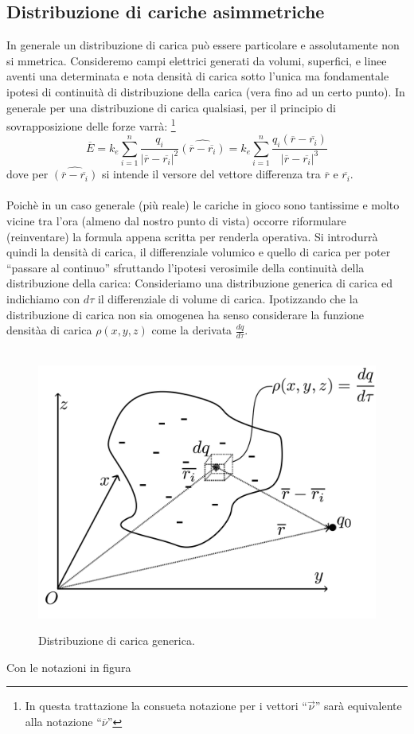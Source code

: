 \documentclass[11pt]{article}
\begin{document}
\subsection{Distribuzione di cariche asimmetriche}
In generale un distribuzione di carica può essere particolare e assolutamente non si mmetrica. Consideremo campi elettrici generati da volumi, superfici, e linee aventi una determinata e nota densità di carica sotto l'unica ma fondamentale ipotesi di continuità di distribuzione della carica (vera fino ad un certo punto).
In generale per una distribuzione di carica qualsiasi, per il principio di sovrapposizione delle forze varrà:
\footnote{In questa trattazione la consueta notazione per i vettori ``$\overrightarrow{\nu}$'' sarà equivalente alla notazione ``$\overline{\nu}$''}$$\overline{E}=k_e\sum_{i=1}^{n}\frac{q_i}{|\overline{r}-\overline{r_i}|^2}\widehat{(\overline{r}-\overline{r_i})}=k_e\sum_{i=1}^{n}\frac{q_i(\overline{r}-\overline{r_i})}{|\overline{r}-\overline{r_i}|^3}$$
dove per $\widehat{(\overline{r}-\overline{r_i})}$ si intende il versore del vettore differenza tra $\overline{r}$ e $\overline{r_i}$.
\\\\Poichè in un caso generale (più reale) le cariche in gioco sono tantissime e molto vicine tra l'ora (almeno dal nostro punto di vista) occorre riformulare (reinventare) la formula appena scritta per renderla operativa.
Si introdurrà quindi la densità di carica, il differenziale volumico e quello di carica per poter ``passare al continuo'' sfruttando l'ipotesi verosimile della continuità della distribuzione della carica:
\newpage
Consideriamo una distribuzione generica di carica ed indichiamo con $d\tau$ il differenziale di volume di carica. Ipotizzando che la distribuzione di carica non sia omogenea ha senso considerare la funzione densitàa di carica $\rho(x,y,z)$ come la derivata $\frac{dq}{d\tau}$.
 \begin{center}
\begin{figure}[H]
			  \vspace{-10pt}
              \hspace{-90pt}
              ~~~~~~~~~~~~~~~~~~~~~~~~~~~~~~~~ \includegraphics[scale=0.22]{distribuzione}
               \caption{\small{Distribuzione di carica generica.}}
               \end{figure} 
               \end{center}
               Con le notazioni in figura
\end{document}
